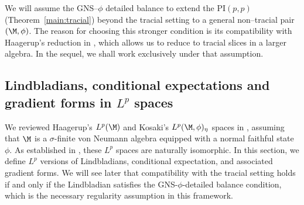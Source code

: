 \documentclass[sn-mathphys-num]{sn-jnl}
\begin{document}
We will assume the GNS--$\phi$ detailed balance to extend the $\mathrm{PI}(p,p)$ (Theorem~\ref{main:tracial}) beyond the tracial setting to a general non--tracial pair $(\M,\phi)$.
The reason for choosing this stronger condition is its compatibility with Haagerup's reduction in , which allows us to reduce to tracial slices in a larger algebra.
In the sequel, we shall work exclusively under that assumption.

\subsection{Lindbladians, conditional expectations and gradient forms in \texorpdfstring{$L^p$}{Lp} spaces}\label{sec:lind-lp}
We reviewed Haagerup's $L^p(\M)$ and Kosaki's $L^p(\M,\phi)_\eta$ spaces in , assuming that $\M$ is a $\sigma$-finite von Neumann algebra equipped with a normal faithful state $\phi$. As established in , these $L^p$ spaces are naturally isomorphic. In this section, we define $L^p$ versions of Lindbladians, conditional expectation, and associated gradient forms. We will see later that compatibility with the tracial setting holds if and only if the Lindbladian satisfies the GNS-$\phi$-detailed balance condition, which is the necessary regularity assumption in this framework.
\end{document}
